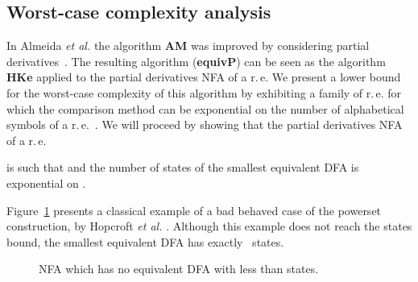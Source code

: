 \documentclass[copyright]{eptcs}
\newcommand{\dfa}{DFA\xspace}
\newcommand{\nfa}{NFA\xspace}
\newcommand{\re}{r.\,e.\xspace}
\newcommand{\equivp}{\textbf{equivP}\xspace}
\newcommand{\hke}{\textbf{HKe}\xspace}
\newcommand{\am}{\textbf{AM}\xspace}
\begin{document}
\vspace{-0.2cm}
\subsection{Worst-case complexity analysis}

In Almeida \emph{et al.}
\cite{almeida08_c:_antim_and_mosses_rewrit_system_revis} the algorithm \am was improved by  considering partial
derivatives~\cite{antimirov96:_partial_deriv_regul_expres_finit_autom_const}.  The
resulting algorithm (\equivp) can be seen as the algorithm \hke
applied to the partial derivatives \nfa of a \re We present a lower
bound for the worst-case complexity of this algorithm by exhibiting a
family of \re for which the comparison method can be exponential on the number of alphabetical symbols
 of a \re~. We will proceed by showing that
the partial derivatives \nfa  of a \re

is such that  and the number of states of
the smallest equivalent \dfa is exponential on .

Figure~\ref{fig:exp_dfa} presents a classical example of a bad
behaved case of the powerset construction, by Hopcroft \emph{et al.}
\cite{hopcroft00_c:_introd_autom_theor_languag_comput}. Although this
example does not reach the  states bound, the smallest equivalent
\dfa has exactly~ states.

\begin{figure}[ht]
  \begin{center}
  \end{center}\vspace{1mm}
  \caption{NFA which has no equivalent DFA with less than 
    states.}
  \label{fig:exp_dfa}
\end{figure}
\end{document}
